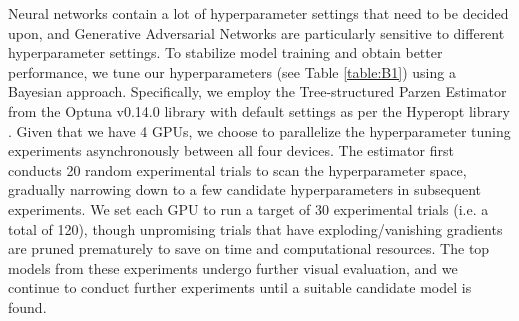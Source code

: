 \documentclass[tc, manuscript]{copernicus}
\begin{document}
Neural networks contain a lot of hyperparameter settings that need to be decided upon, and Generative Adversarial Networks are particularly sensitive to different hyperparameter settings.
To stabilize model training and obtain better performance, we tune our hyperparameters (see Table \ref{table:B1}) using a Bayesian approach.
Specifically, we employ the Tree-structured Parzen Estimator \citep{BergstraAlgorithmsHyperparameterOptimization2011} from the Optuna v0.14.0 \citep{AkibaOptunaNextgenerationHyperparameter2019} library with default settings as per the Hyperopt library \citep{BergstraHyperoptPythonlibrary2015}.
Given that we have 4 GPUs, we choose to parallelize the hyperparameter tuning experiments asynchronously between all four devices.
The estimator first conducts 20 random experimental trials to scan the hyperparameter space, gradually narrowing down to a few candidate hyperparameters in subsequent experiments.
We set each GPU to run a target of 30 experimental trials (i.e. a total of 120), though unpromising trials that have exploding/vanishing gradients are pruned prematurely to save on time and computational resources.
The top models from these experiments undergo further visual evaluation, and we continue to conduct further experiments until a suitable candidate model is found.

\noappendix       %




\appendixfigures  %

\appendixtables   %

\end{document}
